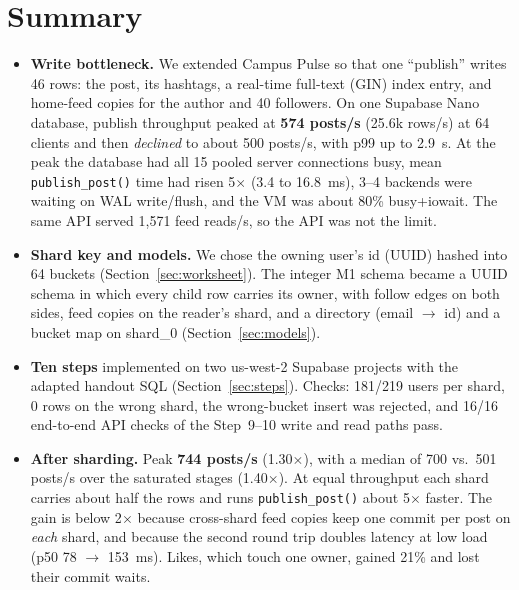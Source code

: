 \section*{Summary}
\begin{itemize}[nosep,leftmargin=1.2em]
\item \textbf{Write bottleneck.} We extended Campus Pulse so that one ``publish'' writes 46 rows: the post, its
      hashtags, a real-time full-text (GIN) index entry, and home-feed copies for the author and 40 followers. On one Supabase
      Nano database, publish throughput peaked at \textbf{574 posts/s} (25.6k rows/s) at 64 clients and then
      \emph{declined} to about 500 posts/s, with p99 up to 2.9~s. At the peak the database had all 15 pooled
      server connections busy, mean \texttt{publish\_post()} time had risen 5$\times$ (3.4 to 16.8~ms), 3--4
      backends were waiting on WAL write/flush, and the VM was about 80\% busy+iowait. The same API served 1{,}571 feed reads/s, so the API was not the limit.
\item \textbf{Shard key and models.} We chose the owning user's id (UUID) hashed into 64 buckets
      (Section~\ref{sec:worksheet}). The integer M1 schema became a UUID schema in which every child row carries its
      owner, with follow edges on both sides, feed copies on the reader's shard, and a directory (email $\to$ id) and a
      bucket map on shard\_0 (Section~\ref{sec:models}).
\item \textbf{Ten steps} implemented on two us-west-2 Supabase projects with the adapted handout SQL
      (Section~\ref{sec:steps}). Checks: 181/219 users per shard, 0 rows on the wrong shard, the wrong-bucket insert was rejected, and 16/16 end-to-end API checks of the Step~9--10 write and read paths pass.
\item \textbf{After sharding.} Peak \textbf{744 posts/s} (1.30$\times$), with a median of 700 vs.\ 501 posts/s over the
      saturated stages (1.40$\times$). At equal throughput each shard carries about half the rows and runs
      \texttt{publish\_post()} about 5$\times$ faster. The gain is below 2$\times$ because cross-shard feed copies keep one commit
      per post on \emph{each} shard, and because the second round trip doubles latency at low load
      (p50 78 $\to$ 153~ms). Likes, which touch one owner, gained 21\% and lost their commit waits.
\end{itemize}
